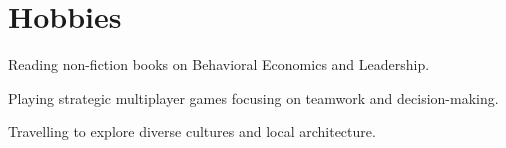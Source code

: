 \documentclass[]{deedy-resume-openfont}
\begin{document}
\begin{minipage}[t]{0.66\textwidth}
\section{Hobbies}
\begin{tightemize}
\item Reading non-fiction books on Behavioral Economics and Leadership.
\item Playing strategic multiplayer games focusing on teamwork and decision-making.
\item Travelling to explore diverse cultures and local architecture.
\end{tightemize}
\sectionsep

\end{minipage}
\end{document}
